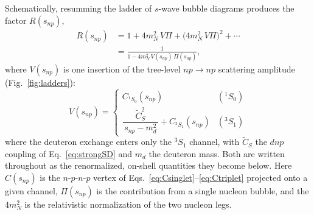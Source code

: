 \documentclass[
  aps,prd,twocolumn,nofootinbib,superscriptaddress,
  longbibliography,floatfix,preprintnumbers
]{revtex4-2}
\newcommand{\CSv}{\tilde{C}_{S}}
\begin{document}
Schematically, resumming the ladder of $s$-wave bubble diagrams produces the factor $R(s_{np})$,
\begin{equation}
\begin{split}
  R(s_{np}) &= 1 + 4m_N^{2}\,V\Pi + \big(4m_N^{2}\,V\Pi\big)^{2} + \cdots\\
            &= \frac{1}{1 - 4m_N^{2}\,V(s_{np})\,\Pi(s_{np})},
\end{split}
  \label{eq:geosum}
\end{equation}
where $V(s_{np})$ is one insertion of the tree-level $n p \rightarrow n p$ scattering amplitude (Fig.~\ref{fig:ladders}):
\begin{equation}
  V(s_{np}) =
  \begin{cases}
    C_{^1S_0}(s_{np}) & (^1S_0)\\[6pt]
    \dfrac{\CSv^{2}}{\,s_{np}-m_{d}^{2}\,} + C_{^3S_1}(s_{np}) & (^3S_1)
  \end{cases}
  \label{eq:Vdef}
\end{equation}
where the deuteron exchange enters only the ${}^{3}S_1$ channel, with $\CSv$
the $dnp$ coupling of Eq.~\eqref{eq:strongSD} and $m_{d}$ the deuteron mass.
Both are written throughout as the renormalized, on-shell quantities they become
below. Here $C(s_{np})$ is the $n$-$p$-$n$-$p$ vertex of
Eqs.~\eqref{eq:Csinglet}--\eqref{eq:Ctriplet} projected onto a given channel,
$\Pi(s_{np})$ is the contribution from a single nucleon bubble, and the $4m_N^{2}$ is the
relativistic normalization of the two nucleon legs.
\end{document}
